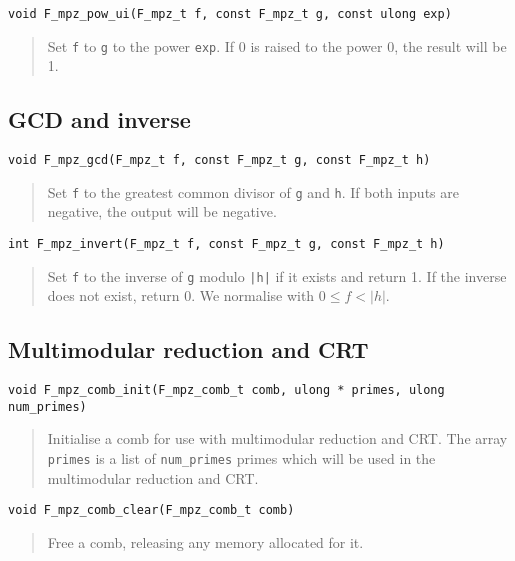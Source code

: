 \documentclass[a4paper,10pt]{article}
\newcommand{\code}{\lstinline}
\begin{document}
\begin{lstlisting}
void F_mpz_pow_ui(F_mpz_t f, const F_mpz_t g, const ulong exp)
\end{lstlisting}
\begin{quote}
Set \code{f} to \code{g} to the power \code{exp}. If 0 is raised to the power 0, the result will be 1.
\end{quote}

\subsection{GCD and inverse}

\begin{lstlisting}
void F_mpz_gcd(F_mpz_t f, const F_mpz_t g, const F_mpz_t h)
\end{lstlisting}
\begin{quote}
Set \code{f} to the greatest common divisor of \code{g} and \code{h}. If both inputs are negative, the output will be negative.
\end{quote}

\begin{lstlisting}
int F_mpz_invert(F_mpz_t f, const F_mpz_t g, const F_mpz_t h)
\end{lstlisting}
\begin{quote}
Set \code{f} to the inverse of \code{g} modulo \code{|h|} if it exists and return 1. If the inverse does not exist, return 0. We normalise with $0 \leq f < |h|$.
\end{quote}

\subsection{Multimodular reduction and CRT}

\begin{lstlisting}
void F_mpz_comb_init(F_mpz_comb_t comb, ulong * primes, ulong num_primes)
\end{lstlisting}
\begin{quote}
Initialise a comb for use with multimodular reduction and CRT. The array \code{primes} is a list of \code{num_primes} primes which will be used in the multimodular reduction and CRT.
\end{quote}

\begin{lstlisting}
void F_mpz_comb_clear(F_mpz_comb_t comb)
\end{lstlisting}
\begin{quote}
Free a comb, releasing any memory allocated for it.
\end{quote}
\end{document}
